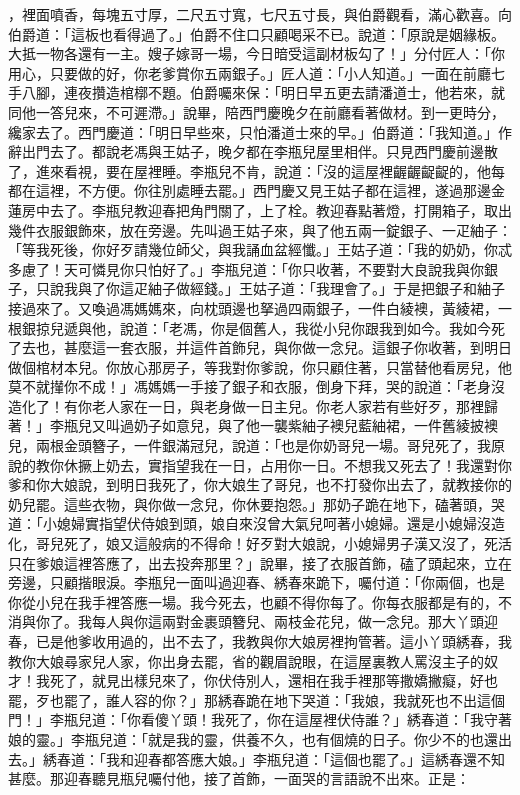 ，裡面噴香，每塊五寸厚，二尺五寸寬，七尺五寸長，與伯爵觀看，滿心歡喜。向伯爵道：「這板也看得過了。」伯爵不住口只顧喝采不已。說道：「原說是姻緣板。大抵一物各還有一主。嫂子嫁哥一場，今日暗受這副材板勾了！」分付匠人：「你用心，只要做的好，你老爹賞你五兩銀子。」匠人道：「小人知道。」一面在前廳七手八腳，連夜攢造棺槨不題。伯爵囑來保：「明日早五更去請潘道士，他若來，就同他一答兒來，不可遲滯。」說畢，陪西門慶晚夕在前廳看著做材。到一更時分，纔家去了。西門慶道：「明日早些來，只怕潘道士來的早。」伯爵道：「我知道。」作辭出門去了。都說老馮與王姑子，晚夕都在李瓶兒屋里相伴。只見西門慶前邊散了，進來看視，要在屋裡睡。李瓶兒不肯，說道：「沒的這屋裡齷齷齪齪的，他每都在這裡，不方便。你往別處睡去罷。」西門慶又見王姑子都在這裡，遂過那邊金蓮房中去了。李瓶兒教迎春把角門關了，上了栓。教迎春點著燈，打開箱子，取出幾件衣服銀飾來，放在旁邊。先叫過王姑子來，與了他五兩一錠銀子、一疋紬子：「等我死後，你好歹請幾位師父，與我誦血盆經懺。」王姑子道：「我的奶奶，你忒多慮了！天可憐見你只怕好了。」李瓶兒道：「你只收著，不要對大良說我與你銀子，只說我與了你這疋紬子做經錢。」王姑子道：「我理會了。」于是把銀子和紬子接過來了。又喚過馮媽媽來，向枕頭邊也拏過四兩銀子，一件白綾襖，黃綾裙，一根銀掠兒遞與他，說道：「老馮，你是個舊人，我從小兒你跟我到如今。我如今死了去也，甚麼這一套衣服，并這件首飾兒，與你做一念兒。這銀子你收著，到明日做個棺材本兒。你放心那房子，等我對你爹說，你只顧住著，只當替他看房兒，他莫不就攆你不成！」馮媽媽一手接了銀子和衣服，倒身下拜，哭的說道：「老身沒造化了！有你老人家在一日，與老身做一日主兒。你老人家若有些好歹，那裡歸著！」李瓶兒又叫過奶子如意兒，與了他一襲紫紬子襖兒藍紬裙，一件舊綾披襖兒，兩根金頭簪子，一件銀滿冠兒，說道：「也是你奶哥兒一場。哥兒死了，我原說的教你休撅上奶去，實指望我在一日，占用你一日。不想我又死去了！我還對你爹和你大娘說，到明日我死了，你大娘生了哥兒，也不打發你出去了，就教接你的奶兒罷。這些衣物，與你做一念兒，你休要抱怨。」那奶子跪在地下，磕著頭，哭道：「小媳婦實指望伏侍娘到頭，娘自來沒曾大氣兒呵著小媳婦。還是小媳婦沒造化，哥兒死了，娘又這般病的不得命！好歹對大娘說，小媳婦男子漢又沒了，死活只在爹娘這裡答應了，出去投奔那里？」說畢，接了衣服首飾，磕了頭起來，立在旁邊，只顧揩眼淚。李瓶兒一面叫過迎春、綉春來跪下，囑付道：「你兩個，也是你從小兒在我手裡答應一場。我今死去，也顧不得你每了。你每衣服都是有的，不消與你了。我每人與你這兩對金裹頭簪兒、兩枝金花兒，做一念兒。那大丫頭迎春，已是他爹收用過的，出不去了，我教與你大娘房裡拘管著。這小丫頭綉春，我教你大娘尋家兒人家，你出身去罷，省的觀眉說眼，在這屋裏教人罵沒主子的奴才！我死了，就見出樣兒來了，你伏侍別人，還相在我手裡那等撒嬌撇癡，好也罷，歹也罷了，誰人容的你？」那綉春跪在地下哭道：「我娘，我就死也不出這個門！」李瓶兒道：「你看傻丫頭！我死了，你在這屋裡伏侍誰？」綉春道：「我守著娘的靈。」李瓶兒道：「就是我的靈，供養不久，也有個燒的日子。你少不的也還出去。」綉春道：「我和迎春都答應大娘。」李瓶兒道：「這個也罷了。」這綉春還不知甚麼。那迎春聽見瓶兒囑付他，接了首飾，一面哭的言語說不出來。正是：

